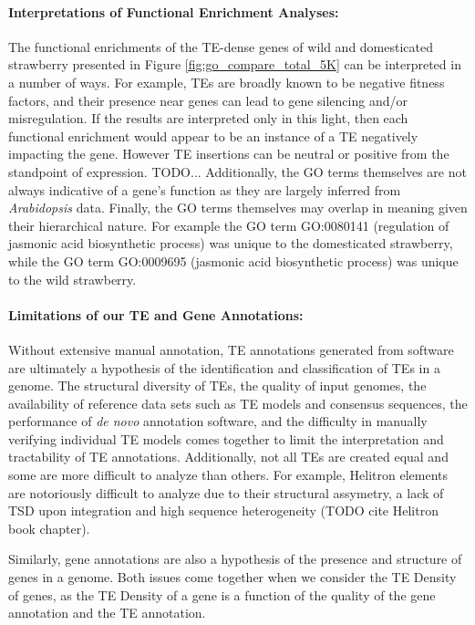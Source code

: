 \documentclass[fleqn,10pt]{olplainarticle}
\begin{document}
\paragraph{Interpretations of Functional Enrichment Analyses:}
The functional enrichments of the TE-dense genes of wild and domesticated strawberry presented in Figure \ref{fig:go_compare_total_5K} can be interpreted in a number of ways.
For example, TEs are broadly known to be negative fitness factors, and their presence near genes can lead to gene silencing and/or misregulation.
If the results are interpreted only in this light, then each functional enrichment would appear to be an instance of a TE negatively impacting the gene.
However TE insertions can be neutral or positive from the standpoint of expression.
TODO...
Additionally, the GO terms themselves are not always indicative of a gene's function as they are largely inferred from \textit{Arabidopsis} data.
Finally, the GO terms themselves may overlap in meaning given their hierarchical nature.
For example the GO term GO:0080141 (regulation of jasmonic acid biosynthetic process) was unique to the domesticated strawberry, while the GO term GO:0009695 (jasmonic acid biosynthetic process) was unique to the wild strawberry.


\paragraph{Limitations of our TE and Gene Annotations:}
Without extensive manual annotation, TE annotations generated from software are ultimately a hypothesis of the identification and classification of TEs in a genome.
The structural diversity of TEs, the quality of input genomes, the availability of reference data sets such as TE models and consensus sequences, the performance of \textit{de novo} annotation software, and the difficulty in manually verifying individual TE models comes together to limit the interpretation and tractability of TE annotations.
Additionally, not all TEs are created equal and some are more difficult to analyze than others.
For example, Helitron elements are notoriously difficult to analyze due to their structural assymetry, a lack of TSD upon integration and high sequence heterogeneity (TODO cite Helitron book chapter).

Similarly, gene annotations are also a hypothesis of the presence and structure of genes in a genome.
Both issues come together when we consider the TE Density of genes, as the TE Density of a gene is a function of the quality of the gene annotation and the TE annotation.
\end{document}

